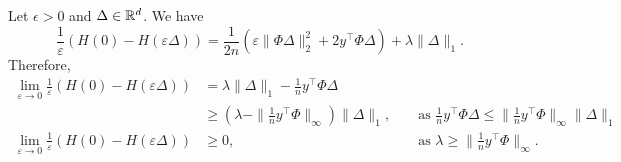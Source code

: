 \begin{questions}
\begin{solution}
       Let $\epsilon > 0$ and $\Delta \in \mathbb{R}^d$. We have
       $$
       \frac{1}{\varepsilon} \left( H(0) - H(\varepsilon \Delta) \right) = \frac{1}{2n} \left( \varepsilon \|\Phi \Delta \|_2^2 + 2 y^\top \Phi \Delta \right) + \lambda \| \Delta \|_1.
       $$
       Therefore,
       $$
       \begin{aligned}
           \lim_{\varepsilon \rightarrow 0}{\frac{1}{\varepsilon} \left( H(0) - H(\varepsilon \Delta) \right)} &= \lambda \| \Delta \|_1 - \frac{1}{n} y^\top \Phi \Delta \\
           &\geq (\lambda - \|\frac{1}{n} y^\top \Phi\|_{\infty}) \| \Delta \|_1, &&\text{ as } \frac{1}{n} y^\top \Phi \Delta \leq \| \frac{1}{n} y^\top \Phi \|_\infty \| \Delta \|_1 \\
           \lim_{\varepsilon \rightarrow 0}{\frac{1}{\varepsilon} \left( H(0) - H(\varepsilon \Delta) \right)} &\geq 0, &&\text{ as } \lambda \geq \|\frac{1}{n} y^\top \Phi\|_{\infty}.
       \end{aligned}
       $$
    \end{solution}
\end{questions}